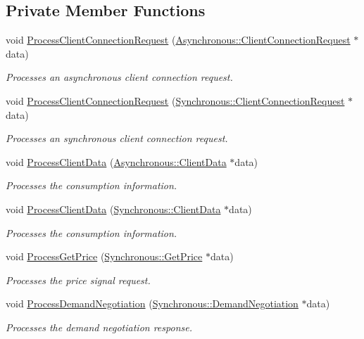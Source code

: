 \subsection*{Private Member Functions}
\begin{DoxyCompactItemize}
\item 
void \hyperlink{class_client_manager_a6d544b4d20cd3b906b6a033c8d70e4a5}{Process\-Client\-Connection\-Request} (\hyperlink{class_terra_swarm_1_1_asynchronous_1_1_client_connection_request}{Asynchronous\-::\-Client\-Connection\-Request} $\ast$data)
\begin{DoxyCompactList}\small\item\em Processes an asynchronous client connection request. \end{DoxyCompactList}\item 
void \hyperlink{class_client_manager_aeaa1090897b231a37c7e61b4f95067d1}{Process\-Client\-Connection\-Request} (\hyperlink{class_terra_swarm_1_1_synchronous_1_1_client_connection_request}{Synchronous\-::\-Client\-Connection\-Request} $\ast$data)
\begin{DoxyCompactList}\small\item\em Processes an synchronous client connection request. \end{DoxyCompactList}\item 
void \hyperlink{class_client_manager_a1dd815fe845945ae8966b3a3f449ba0e}{Process\-Client\-Data} (\hyperlink{class_terra_swarm_1_1_asynchronous_1_1_client_data}{Asynchronous\-::\-Client\-Data} $\ast$data)
\begin{DoxyCompactList}\small\item\em Processes the consumption information. \end{DoxyCompactList}\item 
void \hyperlink{class_client_manager_a1d7fd8ecff3bc921273e2928693e4c7d}{Process\-Client\-Data} (\hyperlink{class_terra_swarm_1_1_synchronous_1_1_client_data}{Synchronous\-::\-Client\-Data} $\ast$data)
\begin{DoxyCompactList}\small\item\em Processes the consumption information. \end{DoxyCompactList}\item 
void \hyperlink{class_client_manager_a841299387a1dcd268266a3c0cfe2a95c}{Process\-Get\-Price} (\hyperlink{class_terra_swarm_1_1_synchronous_1_1_get_price}{Synchronous\-::\-Get\-Price} $\ast$data)
\begin{DoxyCompactList}\small\item\em Processes the price signal request. \end{DoxyCompactList}\item 
void \hyperlink{class_client_manager_ad8841acd386513f41ab0872c67593ff4}{Process\-Demand\-Negotiation} (\hyperlink{class_terra_swarm_1_1_synchronous_1_1_demand_negotiation}{Synchronous\-::\-Demand\-Negotiation} $\ast$data)
\begin{DoxyCompactList}\small\item\em Processes the demand negotiation response. \end{DoxyCompactList}\end{DoxyCompactItemize}
